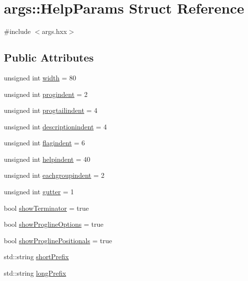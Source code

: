 \hypertarget{structargs_1_1_help_params}{}\section{args\+:\+:Help\+Params Struct Reference}
\label{structargs_1_1_help_params}


{\ttfamily \#include $<$args.\+hxx$>$}

\subsection*{Public Attributes}
\begin{DoxyCompactItemize}
\item 
unsigned int \hyperlink{structargs_1_1_help_params_a24c2d5885e2e16a4d8cacfb5177244e3}{width} = 80
\item 
unsigned int \hyperlink{structargs_1_1_help_params_ae650a9d111eac14d9fc45367fffdcbf0}{progindent} = 2
\item 
unsigned int \hyperlink{structargs_1_1_help_params_a4626c39018ef7b0a04a340d639f8e98e}{progtailindent} = 4
\item 
unsigned int \hyperlink{structargs_1_1_help_params_a51f2528949d3bcfaf9055d5790ea16f2}{descriptionindent} = 4
\item 
unsigned int \hyperlink{structargs_1_1_help_params_a69da9d4c0c9d4386e7aafbb1727bce29}{flagindent} = 6
\item 
unsigned int \hyperlink{structargs_1_1_help_params_a27a6e218f71a17d1ece742f1bca43fe9}{helpindent} = 40
\item 
unsigned int \hyperlink{structargs_1_1_help_params_adfe0f14d1df726f8bbc21c080019c8ac}{eachgroupindent} = 2
\item 
unsigned int \hyperlink{structargs_1_1_help_params_a993e54561b2890ff87d381c8d4522a98}{gutter} = 1
\item 
bool \hyperlink{structargs_1_1_help_params_a359999b309ec9ae528468e7aabbbf355}{show\+Terminator} = true
\item 
bool \hyperlink{structargs_1_1_help_params_a645fe2cfadd50fd62e73b935a2cbbb49}{show\+Progline\+Options} = true
\item 
bool \hyperlink{structargs_1_1_help_params_aa7986e35f4a56eafb4d398af67d929d5}{show\+Progline\+Positionals} = true
\item 
std\+::string \hyperlink{structargs_1_1_help_params_a92097eb29227a600b1528abb96becf3b}{short\+Prefix}
\item 
std\+::string \hyperlink{structargs_1_1_help_params_a65562e96ae0b37cf9aa35c0e5edcec3c}{long\+Prefix}

\end{DoxyCompactItemize}

